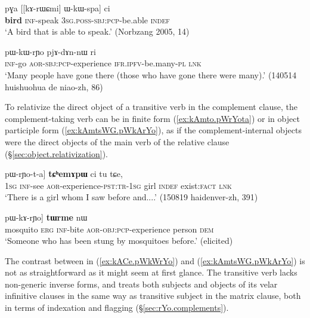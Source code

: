\begin{exe}
\ex \label{ex:kArWCmi.kWspa}
\gll pɣa [[kɤ-rɯɕmi] ɯ-kɯ-spa] ci \\
\textbf{bird} \textsc{inf}-speak \textsc{3sg}.\textsc{poss}-\textsc{sbj}:\textsc{pcp}-be.able \textsc{indef} \\
\glt `A bird that is able to speak.' (Norbzang 2005, 14)
\end{exe}

\begin{exe}
\ex \label{ex:kACe.pWkWrYo}
\gll [kɤ-ɕe] pɯ-kɯ-rɲo pjɤ-dɤn-nɯ ri \\
\textsc{inf}-go \textsc{aor}-\textsc{sbj}:\textsc{pcp}-experience \textsc{ifr}.\textsc{ipfv}-be.many-\textsc{pl} \textsc{lnk} \\
\glt `Many people have gone there (those who have gone there were many).' (140514 huishuohua de niao-zh, 86)
\end{exe}

To relativize the direct object of a transitive verb in the complement clause, the complement-taking verb can be in finite form (\ref{ex:kAmto.pWrYota}) or in object participle form (\ref{ex:kAmtsWG.pWkArYo}), as if the complement-internal objects were the direct objects of the main verb of the relative clause (§\ref{sec:object.relativization}). 

\begin{exe}
\ex \label{ex:kAmto.pWrYota}
\gll [aʑo [kɤ-mto] pɯ-rɲo-t-a] \textbf{tɕʰemɤpɯ} ci tu tɕe, \\
\textsc{1sg} \textsc{inf}-see \textsc{aor}-experience-\textsc{pst}:\textsc{tr}-\textsc{1sg} girl \textsc{indef} exist:\textsc{fact} \textsc{lnk} \\
\glt `There is a girl whom I saw before and....' (150819 haidenver-zh, 391)
\end{exe}

\begin{exe}
\ex \label{ex:kAmtsWG.pWkArYo}
\gll [[ʁmɤrɲɯɣ kɯ kɤ-mtsɯɣ] pɯ-kɤ-rɲo] \textbf{tɯrme} nɯ \\
mosquito \textsc{erg} \textsc{inf}-bite \textsc{aor}-\textsc{obj}:\textsc{pcp}-experience person \textsc{dem} \\
\glt `Someone who has been stung by mosquitoes before.' (elicited)
\end{exe}

The contrast between  in (\ref{ex:kACe.pWkWrYo}) and   (\ref{ex:kAmtsWG.pWkArYo}) is not as straightforward as it might seem at first glance. The transitive verb  lacks non-generic inverse forms, and treats both subjects and objects of its velar infinitive clauses in the same way as transitive subject in the matrix clause, both in terms of indexation and flagging (§\ref{sec:rYo.complements}). 

